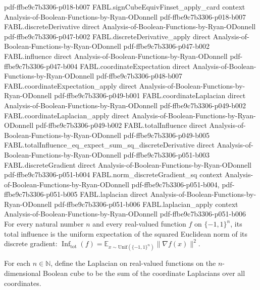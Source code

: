 \begin{theorem}
  {pdf-ffbe9c7b3306-p018-b007}
\proofstep
  {FABL.signCubeEquivFinset_apply_card}
  {context}
  {Analysis-of-Boolean-Functions-by-Ryan-ODonnell}
  {pdf-ffbe9c7b3306-p018-b007}
\proofstep
  {FABL.discreteDerivative}
  {direct}
  {Analysis-of-Boolean-Functions-by-Ryan-ODonnell}
  {pdf-ffbe9c7b3306-p047-b002}
\proofstep
  {FABL.discreteDerivative_apply}
  {direct}
  {Analysis-of-Boolean-Functions-by-Ryan-ODonnell}
  {pdf-ffbe9c7b3306-p047-b002}
\proofstep
  {FABL.influence}
  {direct}
  {Analysis-of-Boolean-Functions-by-Ryan-ODonnell}
  {pdf-ffbe9c7b3306-p047-b004}
\proofstep
  {FABL.coordinateExpectation}
  {direct}
  {Analysis-of-Boolean-Functions-by-Ryan-ODonnell}
  {pdf-ffbe9c7b3306-p048-b007}
\proofstep
  {FABL.coordinateExpectation_apply}
  {direct}
  {Analysis-of-Boolean-Functions-by-Ryan-ODonnell}
  {pdf-ffbe9c7b3306-p049-b001}
\proofstep
  {FABL.coordinateLaplacian}
  {direct}
  {Analysis-of-Boolean-Functions-by-Ryan-ODonnell}
  {pdf-ffbe9c7b3306-p049-b002}
\proofstep
  {FABL.coordinateLaplacian_apply}
  {direct}
  {Analysis-of-Boolean-Functions-by-Ryan-ODonnell}
  {pdf-ffbe9c7b3306-p049-b002}
\proofstep
  {FABL.totalInfluence}
  {direct}
  {Analysis-of-Boolean-Functions-by-Ryan-ODonnell}
  {pdf-ffbe9c7b3306-p049-b005}
\proofstep
  {FABL.totalInfluence_eq_expect_sum_sq_discreteDerivative}
  {direct}
  {Analysis-of-Boolean-Functions-by-Ryan-ODonnell}
  {pdf-ffbe9c7b3306-p051-b003}
\proofstep
  {FABL.discreteGradient}
  {direct}
  {Analysis-of-Boolean-Functions-by-Ryan-ODonnell}
  {pdf-ffbe9c7b3306-p051-b004}
\proofstep
  {FABL.norm_discreteGradient_sq}
  {context}
  {Analysis-of-Boolean-Functions-by-Ryan-ODonnell}
  {pdf-ffbe9c7b3306-p051-b004,
    pdf-ffbe9c7b3306-p051-b005}
\proofstep
  {FABL.laplacian}
  {direct}
  {Analysis-of-Boolean-Functions-by-Ryan-ODonnell}
  {pdf-ffbe9c7b3306-p051-b006}
\proofstep
  {FABL.laplacian_apply}
  {context}
  {Analysis-of-Boolean-Functions-by-Ryan-ODonnell}
  {pdf-ffbe9c7b3306-p051-b006}
For every natural number $n$ and every real-valued function $f$ on $\{-1,1\}^n$, its
total influence is the uniform expectation of the squared Euclidean norm of its discrete
gradient:
$\operatorname{Inf}_{\mathrm{tot}}(f)=\mathbb{E}_{x\sim\mathrm{Unif}(\{-1,1\}^n)}\lVert\nabla
f(x)\rVert^2$.
\end{theorem}

\begin{definition}
\label{FABL.laplacian}
\leanok
{}
For each $n\in\mathbb N$, define the Laplacian on real-valued functions on the
$n$-dimensional Boolean cube to be the sum of the coordinate Laplacians over all
coordinates.
\end{definition}

